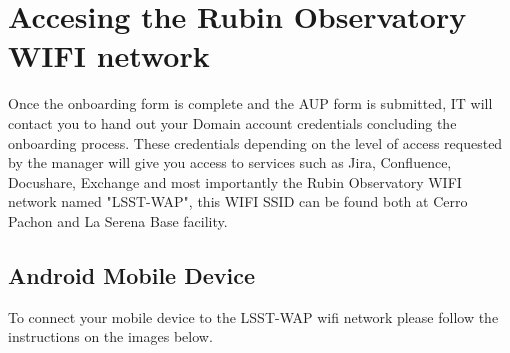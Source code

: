 \newpage 

\section{Accesing the Rubin Observatory WIFI network}
  \label{sec:WIFI}
  Once the onboarding form is complete and the AUP form is submitted, IT will contact you to hand out your Domain account credentials concluding the onboarding process. These credentials depending on the level of access requested by the manager will give you access to services such as Jira, Confluence, Docushare, Exchange and most importantly the Rubin Observatory WIFI network named "LSST-WAP", this WIFI SSID can be found both at Cerro Pachon and La Serena Base facility.
  \vspace{180 mm}
  \subsection{Android Mobile Device}
  To connect your mobile device to the LSST-WAP wifi network please follow the instructions on the images below. 
